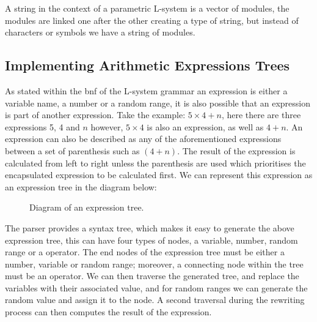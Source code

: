 \begin{flushleft}
\vspace{5mm}

A string in the context of a parametric L-system is a vector of modules, the modules are linked one after the other creating a type of string, but instead of characters or symbols we have a string of modules. \\

\end{flushleft}

\subsection{Implementing Arithmetic Expressions Trees}

\begin{flushleft}

As stated within the \acrshort{bnf} of the L-system grammar an expression is either a variable name, a number or a random range, it is also possible that an expression is part of another expression. Take the example: $5 \times 4 + n$, here there are three expressions 5, 4 and $n$ however, $5 \times 4$ is also an expression, as well as $4 + n$. An expression can also be described as any of the aforementioned expressions between a set of parenthesis such as $(4+n)$. The result of the expression is calculated from left to right unless the parenthesis are used which prioritises the encapsulated expression to be calculated first. We can represent this expression as an expression tree in the diagram below:


\begin{figure}[htbp]
	{\centering
		\setlength{\fboxrule}{1pt}
		\vspace{7px}
		\caption{Diagram of an expression tree.} \label{3D rotations}
	}
\end{figure}
\FloatBarrier

The parser provides a syntax tree, which makes it easy to generate the above expression tree, this can have four types of nodes, a variable, number, random range or a operator. The end nodes of the expression tree must be either a number, variable or random range; moreover, a connecting node within the tree must be an operator. We can then traverse the generated tree, and replace the variables with their associated value, and for random ranges we can generate the random value and assign it to the node. A second traversal during the rewriting process can then computes the result of the expression. \\


\end{flushleft}

